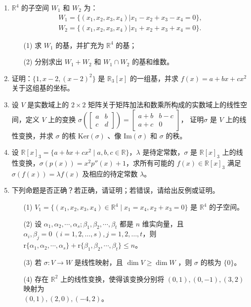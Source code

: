 \begin{enumerate}
    \item \(\mathbb{R}^4\) 的子空间 \(W_1\) 和 \(W_2\) 为：
    \begin{align*}
        W_1 = \{ (x_1,x_2,x_3,x_4) | x_1 - x_2 + x_3 - x_4 = 0 \}, \\
        W_2 = \{ (x_1,x_2,x_3,x_4) | x_1 + x_2 + x_3 + x_4 = 0 \}.
    \end{align*}
    \begin{enumerate}
        \item[(1)] 求 \(W_1\) 的基，并扩充为 \(\mathbb{R}^4\) 的基；
        \item[(2)] 分别求出 \(W_1+W_2\) 和 \(W_1\cap W_2\) 的基和维数。
    \end{enumerate}

    \item 证明：\(\{1,x-2,(x-2)^2\}\) 是 \(\mathbb{R}_3[x]\) 的一组基，并求 \(f(x)=a+bx+cx^2\) 关于这组基的坐标。

    \item 设 \(V\) 是实数域上的 \(2\times2\) 矩阵关于矩阵加法和数乘所构成的实数域上的线性空间，定义 \(V\) 上的变换
    \(\sigma\left(\left[\begin{matrix}
        a & b \\
        c & d
    \end{matrix}\right]\right)= \left[\begin{matrix}
        a + b & b - c \\
        a + c & 0
    \end{matrix}\right]
    \)，
    证明\(\sigma\) 是 \(V\) 上的线性变换，并求 \(\sigma\) 的核 \(\text{Ker}(\sigma)\) 、像 \(\text{Im}(\sigma)\) 和 \(\sigma\) 的秩。

    \item 设 $\mathbb{R}[x]_3 = \{a + bx + cx^2 \mid a, b, c \in \mathbb{R}\}$，$\lambda$ 是待定常数，$\sigma$ 是 $\mathbb{R}[x]_3$ 上的线性变换，$\sigma(p(x)) = x^2 p''(x) + 1$，求所有可能的 $f(x) \in \mathbb{R}[x]_3$ 满足 $\sigma(f(x)) = \lambda f(x)$ 及相应的待定常数 $\lambda$。

    \item 下列命题是否正确？若正确，请证明；若错误，请给出反例或证明。
    \begin{enumerate}
        \item[(1)] \(V_1 = \{(x_1,x_2,x_3,x_4)\in \mathbb{R}^4 \mid x_1 = x_4, x_2 + x_3 = 0\}\) 是 \(\mathbb{R}^4\) 的子空间。
        \item[(2)] 设 \(\alpha_1,\alpha_2,\cdots,\alpha_s;\beta_1,\beta_2,\cdots,\beta_t\) 都是 \(n\) 维实向量，且 \(\alpha_i,\beta_j=0\;(i=1,2,\dots,s),j=1,2,\dots,t\)，则 \(\text{r}\{\alpha_1,\alpha_2,\cdots,\alpha_s\}+\text{r}\{\beta_1,\beta_2,\cdots,\beta_t\} \leq n\)。
        \item[(3)] 若 \(\sigma:V\rightarrow W\) 是线性映射，且 \(\dim V \ge \dim W\) ，则 \(\sigma\) 的核为 \(\{0\}\)。
        \item[(4)] 存在 \(\mathbb{R}^2\) 上的线性变换，使得该变换分别将 \((0,1),(0,-1),(3,2)\) 映射为 \\
        \((0,1),(2,0),(-4,2)\)。
    \end{enumerate}
\end{enumerate}

\clearpage
